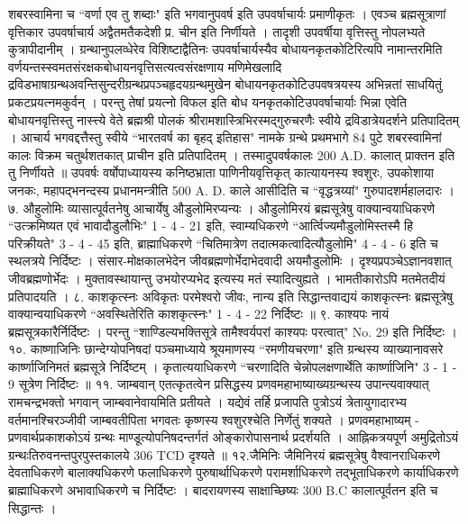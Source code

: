 शबरस्वामिना च ``वर्णा एव तु शब्दाः" इति भगवानुपवर्ष इति उपवर्षाचार्यः प्रमाणीकृतः । एवञ्च ब्रह्मसूत्राणां वृत्तिकार उपवर्षाचार्य अद्वैतमतैकदेशी प्र. चीन इति निर्णीयते । तादृशी उपवर्षीया वृत्तिस्तु नोपलभ्यते कुत्रापीदानीम् ।
ग्रन्थानुपलव्धेरेव विशिष्टाद्वैतिनः उपवर्षाचार्यस्यैव बोधायनकृतकोटिरित्यपि नामान्तरमिति वर्णयन्तस्स्वमतसंरक्षकबोधायनवृत्तिसत्यत्वसंरक्षणाय मणिमेखलादि द्रविडभाषाग्रन्थअवन्तिसुन्दरीग्रन्थप्रपञ्चहृदयग्रन्थमुखेन बोधायनकृतकोटिउपवषत्रयस्य अभिन्नतां साधयितुं प्रकटप्रयत्नमकुर्वन् । परन्तु तेषां प्रयत्नो विफल इति बोध यनकृतकोटिउपवर्षाचार्याः भिन्ना एवेति बोधायनवृत्तिस्तु नास्त्त्ये वेते ब्रह्मश्री पोलकं श्रीरामशास्त्रिभिरस्मद्गुरुचरणैः स्वीये द्रविडात्रेयदर्शने प्रतिपादितम् ।
आचार्य भगवद्दत्तैस्तु स्वीये ``भारतवर्ष का बृहद् इतिहास" नामके ग्रन्थे प्रथमभागे 84 पुटे शबरस्वामिनां कालः विक्रम चतुर्थशतकात् प्राचीन इति प्रतिपादितम् । तस्मादुपवर्षकालः 200 A.D. कालात् प्राक्तन इति तु निर्णीयते ॥
उपवर्षः वर्षोपाध्यायस्य कनिष्ठभ्राता पाणिनीयवृत्तिकृत् कात्यायनस्य श्वशुरः, उपकोशाया जनकः, महापद्भनन्दस्य प्रधानमन्त्रीति 500 A. D. काले आसीदिति च ``वृद्धत्रय्यां" गुरुपादशर्महालदारः ।
७. औहुलोमिः
व्यासात्पूर्वतनेषु आचार्येषु औडुलोमिरप्यन्यः । औडुलोमिरयं ब्रह्मसूत्रेषु वाक्यान्वयाधिकरणे ``उत्क्रमिष्यत एवं भावादौडुलौभिः" 1 - 4 - 21 इति, स्वाम्यधिकरणे ``आर्त्विज्यमौडुलोमिस्तस्मै हि परिक्रीयते" 3 - 4 - 45 इति, ब्राह्माधिकरणे ``चितिमात्रेण तदात्मकत्वादित्यौडुलोमि" 4 - 4 - 6 इति च स्थलत्रये निर्दिष्टः ।
संसार-मोक्षकालभेदेन जीवब्रह्मणोर्भेदाभेदवादी अयमौडुलोमिः । दृश्यप्रपञ्चेऽज्ञानवशात् जीवब्रह्मणोर्भेदः । मुक्तावस्थायान्तु उभयोरप्यभेद इत्यस्य मतं स्यादित्युह्यते । भामतीकारोऽपि मतमेतदीयं प्रतिपादयति । 
८. काशकृत्स्नः
अविकृतः परमेश्वरो जीवः, नान्य इति सिद्धान्तवाद्ययं काशकृत्स्नः ब्रह्मसूत्रेषु वाक्यान्वयाधिकरणे ``अवस्थितेरिति काशकृत्स्नः" 1 - 4 - 22 निर्दिष्टः ॥
९. काश्यपः
नायं ब्रह्मसूत्रकारैर्निर्दिष्टः । परन्तु ``शाण्डिल्यभक्तिसूत्रे तामैश्वर्यपरां काश्यपः परत्वात्" No. 29 इति निर्दिष्टः ।
१०. काष्णाजिनिः
छान्देग्योपनिषदां पञ्चमाध्याये श्रूयमाणस्य ``रमणीयचरणा" इति ग्रन्थस्य व्याख्यानावसरे कार्ष्णाजिनिमतं ब्रह्मसूत्रे निर्दिष्टम् । कृतात्ययाधिकरणे ``चरणादिति चेन्नोपलक्षणार्थेति कार्ष्णाजिनि" 3 - 1 - 9 सूत्रेण निर्दिष्टः ॥
११. जाम्बवान्
एतत्कृतत्वेन प्रसिद्धस्य प्रणवमहाभाष्याख्यग्रन्थस्य उपान्त्यवाक्यात् रामचन्द्रभक्तो भगवान् जाम्बवानेवायमिति प्रतीयते । यद्येवं तर्हि प्रजापति पुत्रोऽयं त्रेतायुगादारभ्य वर्तमानश्चिरञ्जीवी जाम्बवतीपिता भगवतः कृष्णस्य श्वशुरश्चेति निर्णेतुं शक्यते ।
प्रणवमहाभाष्यम् -
प्रणवार्थप्रकाशकोऽयं ग्रन्थः माण्डूत्योपनिषदन्तर्गतं ओङ्कारोपासनार्थ प्रदर्शयति । आह्निकत्रयपूर्ण अमुद्रितोऽयं ग्रन्थःतिरुवनन्तपुरपुस्तकालये 306 TCD दृश्यते ॥
१२.जैमिनिः
जैमिनिरयं ब्रह्मसूत्रेषु वैश्वानराधिकरणे देवताधिकरणे बालाक्यधिकरणे फलाधिकरणे पुरुषार्थाधिकरणे परामर्शाधिकरणे तद्भूताधिकरणे कार्याधिकरणे ब्राह्माधिकरणे अभावाधिकरणे च निर्दिष्टः । बादरायणस्य साक्षाच्छिष्यः 300 B.C कालात्पूर्वतन इति च सिद्धान्तः ।
